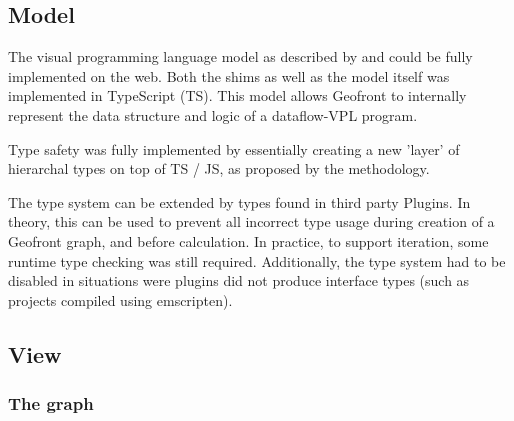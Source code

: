 


\subsection{Model}

The visual programming language model as described by  and  could be fully implemented on the web. 
Both the shims as well as the model itself was implemented in TypeScript (TS). 
This model allows Geofront to internally represent the data structure and logic of a dataflow-VPL program. 

Type safety was fully implemented by essentially creating a new 'layer' of hierarchal types on top of TS / JS, as proposed by the methodology.

The type system can be extended by types found in third party Plugins.  
In theory, this can be used to prevent all incorrect type usage during creation of a Geofront graph, and before calculation.
In practice, to support iteration, some runtime type checking was still required. 
Additionally, the type system had to be disabled in situations were plugins did not produce interface types (such as projects compiled using emscripten).

\subsection{View}

\subsubsection{The graph}

